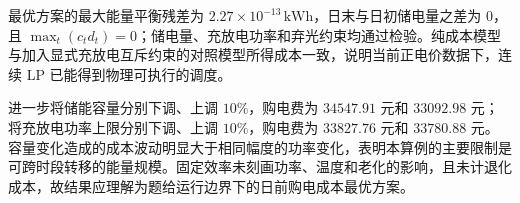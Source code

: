 最优方案的最大能量平衡残差为 $2.27\times10^{-13}\,\mathrm{kWh}$，日末与日初储电量之差为 0，且 $\max_t(c_td_t)=0$；储电量、充放电功率和弃光约束均通过检验。纯成本模型与加入显式充放电互斥约束的对照模型所得成本一致，说明当前正电价数据下，连续 LP 已能得到物理可执行的调度。

进一步将储能容量分别下调、上调 $10\%$，购电费为 $34547.91$ 元和 $33092.98$ 元；将充放电功率上限分别下调、上调 $10\%$，购电费为 $33827.76$ 元和 $33780.88$ 元。容量变化造成的成本波动明显大于相同幅度的功率变化，表明本算例的主要限制是可跨时段转移的能量规模。固定效率未刻画功率、温度和老化的影响\cite{grimaldi}，且未计退化成本，故结果应理解为题给运行边界下的日前购电成本最优方案。
